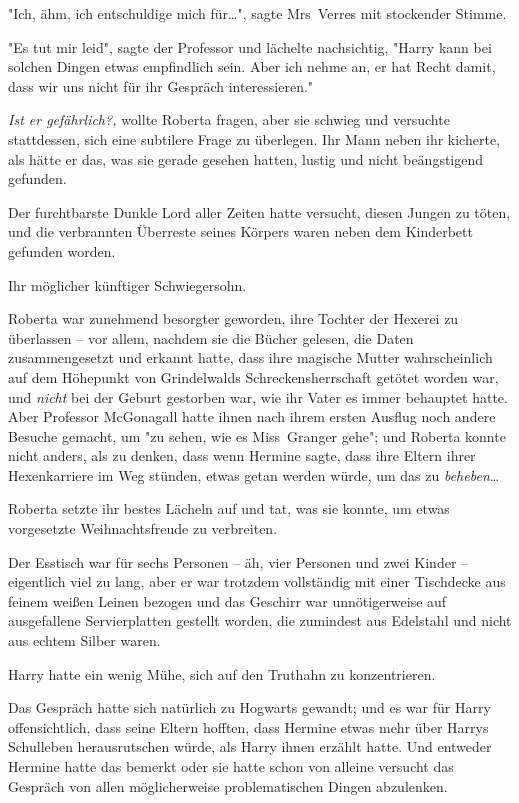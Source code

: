 {"Ich, ähm, ich entschuldige mich für…", sagte Mrs~Verres mit stockender Stimme.

"Es tut mir leid", sagte der Professor und lächelte nachsichtig, "Harry kann bei solchen Dingen etwas empfindlich sein. Aber ich nehme an, er hat Recht damit, dass wir uns nicht für ihr Gespräch interessieren."

\emph{Ist er gefährlich?,} wollte Roberta fragen, aber sie schwieg und versuchte stattdessen, sich eine subtilere Frage zu überlegen. Ihr Mann neben ihr kicherte, als hätte er das, was sie gerade gesehen hatten, lustig und nicht beängstigend gefunden.

Der furchtbarste Dunkle Lord aller Zeiten hatte versucht, diesen Jungen zu töten, und die verbrannten Überreste seines Körpers waren neben dem Kinderbett gefunden worden.

Ihr möglicher künftiger Schwiegersohn.

Roberta war zunehmend besorgter geworden, ihre Tochter der Hexerei zu überlassen -- vor allem, nachdem sie die Bücher gelesen, die Daten zusammengesetzt und erkannt hatte, dass ihre magische Mutter wahrscheinlich auf dem Höhepunkt von Grindelwalds Schreckensherrschaft getötet worden war, und \emph{nicht} bei der Geburt gestorben war, wie ihr Vater es immer behauptet hatte. Aber Professor McGonagall hatte ihnen nach ihrem ersten Ausflug noch andere Besuche gemacht, um "zu sehen, wie es Miss~Granger gehe"; und Roberta konnte nicht anders, als zu denken, dass wenn Hermine sagte, dass ihre Eltern ihrer Hexenkarriere im Weg stünden, etwas getan werden würde, um das zu \emph{beheben}…

Roberta setzte ihr bestes Lächeln auf und tat, was sie konnte, um etwas vorgesetzte Weihnachtsfreude zu verbreiten.

Der Esstisch war für sechs Personen -- äh, vier Personen und zwei Kinder -- eigentlich viel zu lang, aber er war trotzdem vollständig mit einer Tischdecke aus feinem weißen Leinen bezogen und das Geschirr war unnötigerweise auf ausgefallene Servierplatten gestellt worden, die zumindest aus Edelstahl und nicht aus echtem Silber waren.

Harry hatte ein wenig Mühe, sich auf den Truthahn zu konzentrieren.

Das Gespräch hatte sich natürlich zu Hogwarts gewandt; und es war für Harry offensichtlich, dass seine Eltern hofften, dass Hermine etwas mehr über Harrys Schulleben herausrutschen würde, als Harry ihnen erzählt hatte. Und entweder Hermine hatte das bemerkt oder sie hatte schon von alleine versucht das Gespräch von allen möglicherweise problematischen Dingen abzulenken.

}
